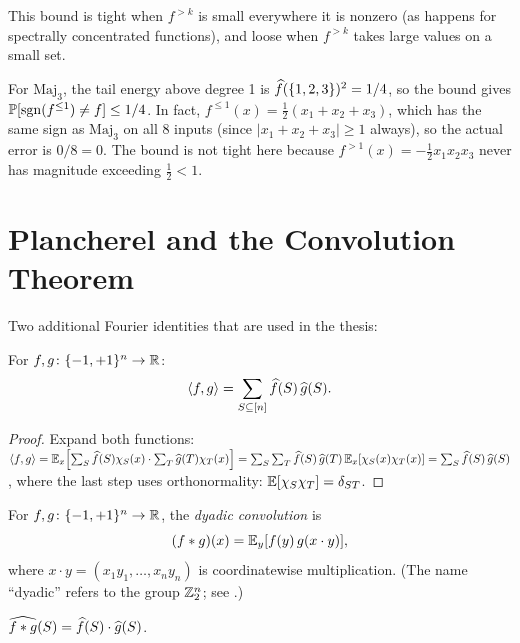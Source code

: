 This bound is tight when $f^{>k}$ is small everywhere it is nonzero
(as happens for spectrally concentrated functions), and loose when
$f^{>k}$ takes large values on a small set.

\begin{example}\label{ex:maj3-truncation}
For $\text{Maj}_3$, the tail energy above degree 1 is
$\widehat{f}(\{1,2,3\})^2 = 1/4$, so the bound gives
$\mathbb{P}[\operatorname{sgn}(f^{\leq 1}) \neq f] \leq 1/4$. In fact, $f^{\leq 1}(x) =
\frac{1}{2}(x_1 + x_2 + x_3)$, which has the same sign as $\text{Maj}_3$
on all 8 inputs (since $|x_1 + x_2 + x_3| \geq 1$ always), so the
actual error is $0/8 = 0$. The bound is not tight here because
$f^{>1}(x) = -\frac{1}{2}x_1 x_2 x_3$ never has magnitude exceeding
$\frac{1}{2} < 1$.
\end{example}


\section{Plancherel and the Convolution Theorem}\label{sec:convolution}

Two additional Fourier identities that are used in the thesis:

\begin{theorem}\label{thm:plancherel}
For $f, g \colon \{-1,+1\}^n \to \mathbb{R}$:
\[
  \langle f, g \rangle = \sum_{S \subseteq [n]} \widehat{f}(S)\, \widehat{g}(S).
\]
\end{theorem}

\begin{proof}
Expand both functions:
$\langle f, g \rangle = \mathbb{E}_x\!\left[\sum_S \widehat{f}(S)\chi_S(x) \cdot \sum_T \widehat{g}(T)\chi_T(x)\right]
= \sum_S \sum_T \widehat{f}(S)\,\widehat{g}(T)\,\mathbb{E}_x[\chi_S(x)\chi_T(x)]
= \sum_S \widehat{f}(S)\,\widehat{g}(S)$,
where the last step uses orthonormality: $\mathbb{E}[\chi_S \chi_T] = \delta_{ST}$.
\end{proof}

\begin{definition}\label{def:convolution}
For $f, g \colon \{-1,+1\}^n \to \mathbb{R}$, the \emph{dyadic convolution} is
\[
  (f \ast g)(x) = \mathbb{E}_y[f(y)\, g(x \cdot y)],
\]
where $x \cdot y = (x_1 y_1, \ldots, x_n y_n)$ is coordinatewise
multiplication. (The name ``dyadic'' refers to the group $\mathbb{Z}_2^n$;
see .)
\end{definition}

\begin{theorem}\label{thm:convolution}
$\widehat{f \ast g}(S) = \widehat{f}(S) \cdot \widehat{g}(S)$.
\end{theorem}

